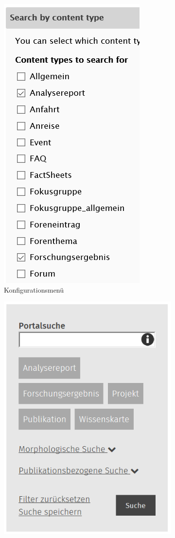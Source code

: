 \begin{figure}[H]
	\centering
	\begin{subfigure}[b]{0.23\textwidth}
		\centering
		\includegraphics[height=0.20\textheight]{images/config_morphsearch}
		\caption[]{Konfigurationsmenü}
		\label{fig:config_morphsearch}
	\end{subfigure}
	\begin{subfigure}[b]{0.23\textwidth}
		\centering
		\includegraphics[height=0.20\textheight]{images/example_morphsearchblock}

\end{subfigure}
\end{figure}
